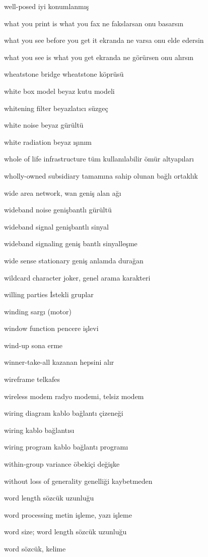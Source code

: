 \documentclass[12pt,fleqn]{article}\usepackage{../../common}
\begin{document}
well-posed iyi konumlanmış

what you print is what you fax ne fakslarsan onu basarsın

what you see before you get it ekranda ne varsa onu elde edersin

what you see is what you get ekranda ne görürsen onu alırsın

wheatstone bridge wheatstone köprüsü

white box model beyaz kutu modeli

whitening filter beyazlatıcı süzgeç

white noise beyaz gürültü

white radiation beyaz ışınım

whole of life infrastructure tüm kullanılabilir ömür altyapıları

wholly-owned subsidiary tamamına sahip olunan bağlı ortaklık

wide area network, wan geniş alan ağı

wideband noise genişbantlı gürültü

wideband signal genişbantlı sinyal

wideband signaling geniş bantlı sinyalleşme

wide sense stationary geniş anlamda durağan

wildcard character joker, genel arama karakteri

willing parties İstekli gruplar

winding sargı (motor)

window function pencere işlevi

wind-up sona erme

winner-take-all kazanan hepsini alır

wireframe telkafes

wireless modem radyo modemi, telsiz modem

wiring diagram kablo bağlantı çizeneği

wiring kablo bağlantısı

wiring program kablo bağlantı programı

within-group variance öbekiçi değişke

without loss of generality genelliği kaybetmeden

word length sözcük uzunluğu

word processing metin işleme, yazı işleme

word size; word length sözcük uzunluğu

word sözcük, kelime
\end{document}
